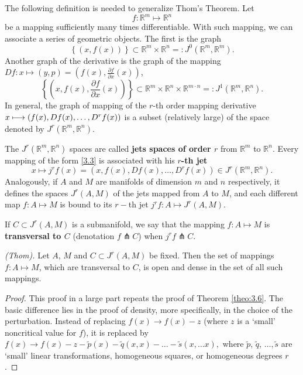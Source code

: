 The following definition is needed to generalize Thom's Theorem. Let
\begin{equation}
\label{3.3}
f:\mathbb{R}^{m}\longmapsto \mathbb{R}^{n}
\end{equation}
be a mapping sufficiently many times differentiable. With such mapping, we can associate a series of geometric objects. The first is the graph
$$
\left\{ (x,f(x))\right\} \subset \mathbb{R}^{m}\times \mathbb{R}^{n}=:J^{0}(\mathbb{R}^{m}, \mathbb{R}^{m}).
$$
Another graph of the derivative is the graph of the mapping $Df: x\longmapsto
(y,p) = (f(x), \frac{\partial f}{\partial x}(x))$,
$$
\left\{ \left( x,f(x),\frac{\partial f}{\partial x}(x)\right) \right\}
\subset \mathbb{R}^{m}\times \mathbb{R}^{n}\times \mathbb{R}^{m\cdot n}=:J^{1}(\mathbb{R}^{m},\mathbb{R}^{n}).
$$
In general, the graph of mapping of the $r$-th order mapping derivative $x \longmapsto (f(x), Df(x),\linebreak \ldots, D^{r}f(x))$ is a subset (relatively large) of the space denoted by $J^{r}(\mathbb{R}^{m},\mathbb{R}^{n})$.

\begin{definition}
	The $J^{r}(\mathbb{R}^{m},\mathbb{R}^{n})$ spaces are called \textbf{jets spaces of  order $r$} from $\mathbb{R}^{m}$ to $\mathbb{R}^{n}.$ Every mapping of the form \eqref{3.3} is associated with his \textbf{$r$-th jet}
	$$
	x\longmapsto j^{r}f(x)=(x,f(x),Df(x),\ldots ,D^{r}f(x))\in J^{r}(\mathbb{R}%
	^{m},\mathbb{R}^{n}).
	$$
	Analogously, if $A$ and $M$ are manifolds of dimension $m$ and $n$ respectively, it defines the spaces $J^{r}(A,M)$ of the jets mapped from $A$ to $M$, and each different map $f:A\longmapsto M$ is bound to its $r-$th jet $j^{r}f:A\longmapsto J^{r}(A,M).$
\end{definition}

\begin{definition}
	If $C\subset J^{r}(A,M)$ is a submanifold, we say that the mapping $f:A\longmapsto M$ is \textbf{transversal to $C$} (denotation $f\pitchfork C$) when $j^{r}f\pitchfork C.$
\end{definition}

\begin{theorem}\emph{(Thom).} \label{theo:3.11}
	Let $A$, $M$ and $C\subset J^{r}(A,M)$ be fixed. Then the set of mappings $f:A\longmapsto M$, which are transversal to $C$, is open and dense in the set of all such mappings.
	\begin{proof}
		This proof in a large part repeats the proof of Theorem \ref{theo:3.6}. The basic difference lies in the proof of density, more specifically, in the choice of the perturbation. Instead of replacing $f(x)\rightarrow f(x)-z$ (where $z$ is a `small' noncritical value for $f$), it is replaced by $f(x)\rightarrow
		f(x)-z-\tilde{p}(x)-\tilde{q}(x,x)-\ldots -\tilde{s}(x,\ldots x),$ where $\tilde{p}$, $\tilde{q}$, $\ldots ,\tilde{s}$ are `small' linear transformations, homogeneous squares, or homogeneous degrees $r$.
	\end{proof}
\end{theorem}

